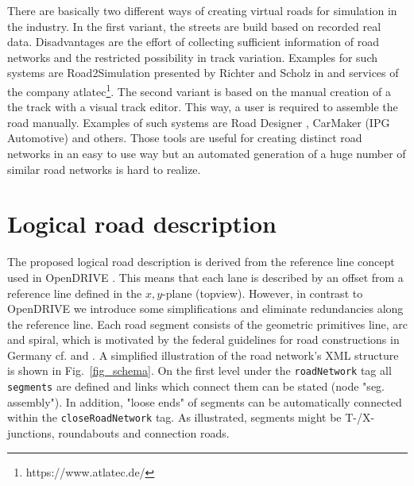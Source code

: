 \documentclass[a4paper, 10pt, conference]{ieeeconf}      %
\begin{document}
There are basically two different ways of creating virtual roads for simulation in the industry. In the first variant, the streets are build based on recorded real data. Disadvantages are the effort of collecting sufficient information of road networks and the restricted possibility in track variation. Examples for such systems are Road2Simulation presented by Richter and Scholz in \cite{dlr110094} and services of the company atlatec\footnote{https://www.atlatec.de/}.
The second variant is based on the manual creation of a the track with a visual track editor. This way, a user is required to assemble the road manually. Examples of such systems are Road Designer \cite{ROD}, CarMaker (IPG Automotive) and others. Those tools are useful for creating distinct road networks in an easy to use way but an automated generation of a huge number of similar road networks is hard to realize.

\section{Logical road description}\label{sec_logicalDesc}
The proposed logical road description is derived from the reference line concept used in OpenDRIVE \cite{odr1.5}. This means that each lane is described by an offset from a reference line defined in the $x,y$-plane (topview). However, in contrast to OpenDRIVE we introduce some simplifications and eliminate redundancies along the reference line. Each road segment consists of the geometric primitives line, arc and spiral, which is motivated by the federal guidelines for road constructions in Germany cf. \cite{Baier.2008} and \cite{StraenNRW.2019}. A simplified illustration of the road network's XML structure is shown in Fig.~\ref{fig_schema}. On the first level under the \texttt{roadNetwork} tag all \texttt{segments} are defined and links which connect them can be stated (node "seg. assembly"). In addition, "loose ends" of segments can be automatically connected within the \texttt{closeRoadNetwork} tag. As illustrated, segments might be T-/X-junctions, roundabouts and connection roads. 
\end{document}
